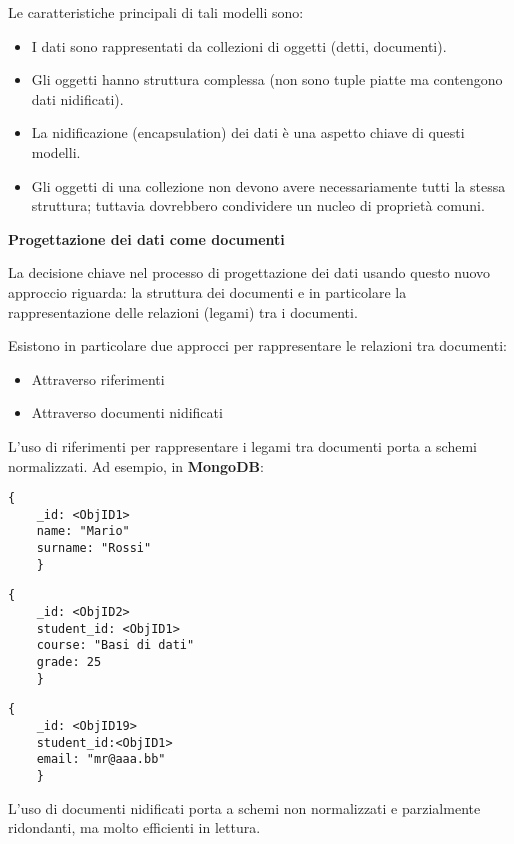 \documentclass[a4paper, 10pt]{article}
\theoremstyle{definition}
\begin{document}
		\noindent
		Le caratteristiche principali di tali modelli sono:
		\begin{itemize}
			\item I dati sono rappresentati da collezioni di oggetti (detti,
			documenti).
			\item Gli oggetti hanno struttura complessa (non sono tuple piatte
			ma contengono dati nidificati).
			\item La nidificazione (encapsulation) dei dati è una aspetto chiave
			di questi modelli.
			\item Gli oggetti di una collezione non devono avere
			necessariamente tutti la stessa struttura; tuttavia dovrebbero
			condividere un nucleo di proprietà comuni.
		\end{itemize}
	
		\textbf{Progettazione dei dati come documenti}
		
		\noindent
		La decisione chiave nel processo di progettazione dei
		dati usando questo nuovo approccio riguarda: la
		struttura dei documenti e in particolare la
		rappresentazione delle relazioni (legami) tra i
		documenti.
		
		\noindent
		Esistono in particolare due approcci per rappresentare
		le relazioni tra documenti:
		\begin{itemize}
			\item Attraverso riferimenti
			\item Attraverso documenti nidificati
		\end{itemize}
		L’uso di riferimenti per rappresentare i legami tra
		documenti porta a schemi normalizzati.
		Ad esempio, in \textbf{MongoDB}:
		
		\begin{multicols}{2}

			\lstset{framexleftmargin=-9mm,frameround=tttt}
			\begin{lstlisting}[frame=tblr,caption={Student Document}]
	{
	_id: <ObjID1>
	name: "Mario"
	surname: "Rossi"
	}
			\end{lstlisting}

			\vfill\null
			\columnbreak

			\begin{lstlisting}[frame=tblr,caption={Exam Document}]
	{
	_id: <ObjID2>
	student_id: <ObjID1>
	course: "Basi di dati"
	grade: 25
	}
			\end{lstlisting}	
			\begin{lstlisting}[frame=tblr,caption={Contact Document}]
	{
	_id: <ObjID19>
	student_id:<ObjID1>
	email: "mr@aaa.bb"
	}
			\end{lstlisting}
			
		\end{multicols}
		L’uso di documenti nidificati porta a schemi non
		normalizzati e parzialmente ridondanti, ma molto
		efficienti in lettura.
		
\end{document}
